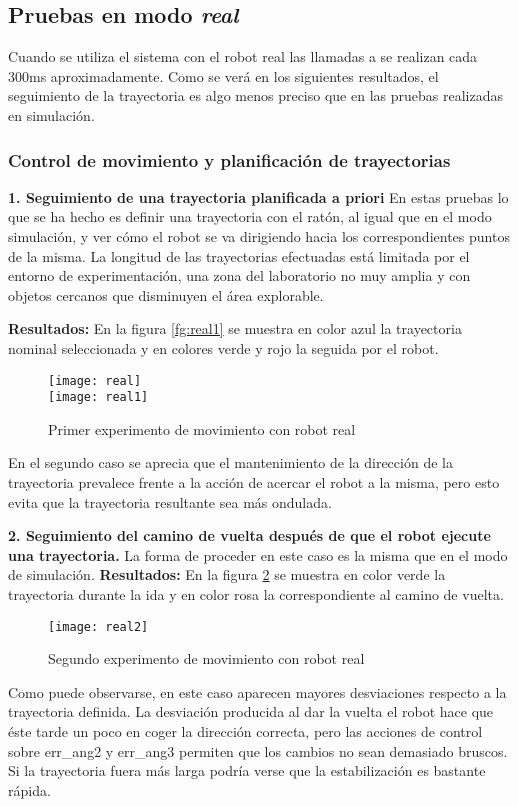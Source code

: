\subsection{Pruebas en modo \emph{real}}
Cuando se utiliza el sistema con el robot real las llamadas a  se realizan cada 300ms aproximadamente. Como se verá en los siguientes resultados, el seguimiento de la trayectoria es algo menos preciso que en las pruebas realizadas en simulación.

\subsubsection{Control de movimiento y planificación de trayectorias}

\noindent
\textbf{\textbf{1.} Seguimiento de una trayectoria planificada a priori}
En estas pruebas lo que se ha hecho es definir una trayectoria con el ratón, al igual que en el modo simulación, y ver cómo el robot se va dirigiendo hacia los correspondientes puntos de la misma. La longitud de las trayectorias efectuadas está limitada por el entorno de experimentación, una zona del laboratorio no muy amplia y con objetos cercanos que disminuyen el área explorable.

\textbf{Resultados:}
En la figura \ref{fg:real1} se muestra en color azul la trayectoria nominal seleccionada y en colores verde y rojo la seguida por el robot.
\begin{figure}[h]
  \centering\texttt{[image: real]}\\
  \hspace{0.5cm}\texttt{[image: real1]}
  \caption{Primer experimento de movimiento con robot real}\label{fg:real}
\end{figure}

En el segundo caso se aprecia que el mantenimiento de la dirección de la trayectoria prevalece frente a la acción de acercar el robot a la misma, pero esto evita que la trayectoria resultante sea más ondulada.

\noindent
\textbf{\textbf{2.} Seguimiento del camino de vuelta después de que el robot ejecute una trayectoria.}
La forma de proceder en este caso es la misma que en el modo de simulación.
\textbf{Resultados:}
En la figura \ref{fg:real2} se muestra en color verde la trayectoria durante la ida y en color rosa la correspondiente al camino de vuelta.
\begin{figure}[h]
  \centering\texttt{[image: real2]}\\
  \caption{Segundo experimento de movimiento con robot real}\label{fg:real2}
\end{figure}

Como puede observarse, en este caso aparecen mayores desviaciones respecto a la trayectoria definida. La desviación producida al dar la vuelta el robot hace que éste tarde un poco en coger la dirección correcta, pero las acciones de control sobre err\_ang2 y err\_ang3 permiten que los cambios no sean demasiado bruscos. Si la trayectoria fuera más larga podría verse que la estabilización es bastante rápida.
